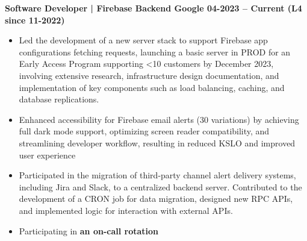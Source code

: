 \textbf{Software Developer | Firebase Backend \hspace{-10mm} \hfill Google \hfill  04-2023 -- Current (L4 since 11-2022)}\par

\begin{itemize}
  \item Led the development of a new server stack to support Firebase app configurations fetching requests, launching a basic server in PROD for an Early Access Program supporting <10 customers by December 2023, involving extensive research, infrastructure design documentation, and implementation of key components such as load balancing, caching, and database replications.
  \item Enhanced accessibility for Firebase email alerts (30 variations) by achieving full dark mode support, optimizing screen reader compatibility, and streamlining developer workflow, resulting in reduced KSLO and improved user experience
  \item Participated in the migration of third-party channel alert delivery systems, including Jira and Slack, to a centralized backend server. Contributed to the development of a CRON job for data migration, designed new RPC APIs, and implemented logic for interaction with external APIs.
	\item Participating in \textbf{an on-call rotation}
\end{itemize}\par
